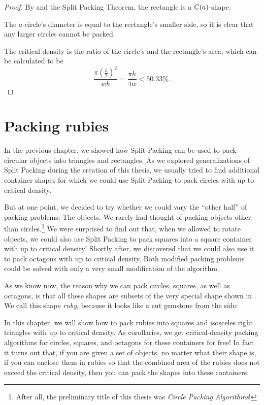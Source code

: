 \documentclass[a4paper,style=print,bibliography=totoc,nexus,lnum,extramargin]{tubsbook}
\begin{document}
\begin{proof}
    By  and the Split Packing Theorem, the rectangle is a $\mathbb{C}(a)$-shape.

    The $a$-circle's diameter is equal to the rectangle's smaller side, so it is clear that any larger circles cannot be packed.

    The critical density is the ratio of the circle's and the rectangle's area, which can be calculated to be $$\frac{\pi (\frac{h}{2})^2}{wh} = \frac{\pi h}{4w} < 50.33\%.$$
\end{proof}

\chapter{Packing rubies}\label{ch:rubies}

In the previous chapter, we showed how Split Packing can be used to pack circular objects into triangles and rectangles.
As we explored generalizations of Split Packing during the creation of this thesis, we usually tried to find additional container shapes for which we could use Split Packing to pack circles with up to critical density. 

But at one point, we decided to try whether we could vary the “other half” of packing problems: The objects. We rarely had thought of packing objects other than circles.\footnote{After all, the preliminary title of this thesis was \emph{Circle Packing Algorithms}!} 
We were surprised to find out that, when we allowed to rotate objects, we could also use Split Packing to pack squares into a square container with up to critical density! Shortly after, we discovered that we could also use it to pack octagons with up to critical density. Both modified packing problems could be solved with only a very small modification of the algorithm.

As we know now, the reason why we can pack circles, squares, as well as octagons, is that all these shapes are subsets of the very special shape shown in . We call this shape \emph{ruby}, because it looks like a cut gemstone from the side:


In this chapter, we will show how to pack rubies into squares and isosceles right triangles with up to critical density. As corollaries, we get critical-density packing algorithms for circles, squares, and octagons for these containers for free!
In fact it turns out that, if you are given a set of objects, no matter what their shape is, if you can enclose them in rubies so that the combined area of the rubies does not exceed the critical density, then you can pack the shapes into these containers.
\end{document}
